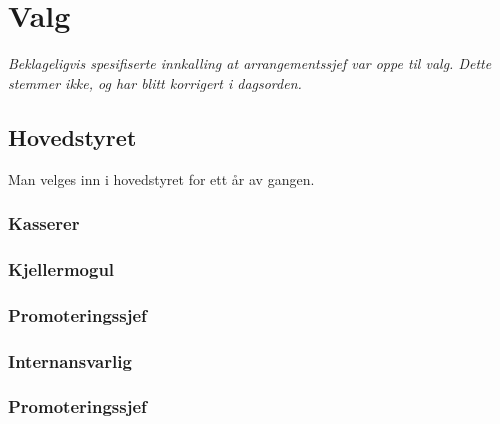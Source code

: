 \documentclass[10pt,norsk,a4paper]{article}
\begin{document}
\newpage

\section{Valg}

\textit{
    Beklageligvis spesifiserte innkalling at arrangementssjef var oppe til valg.
    Dette stemmer ikke, og har blitt korrigert i dagsorden.
}

\begin{minipage}[t]{0.49\textwidth}
\subsection{Hovedstyret} %
Man velges inn i hovedstyret for ett år av gangen.

\subsubsection{Kasserer}
\subsubsection{Kjellermogul}
\subsubsection{Promoteringssjef}
\subsubsection{Internansvarlig}
\subsubsection{Promoteringssjef}

\end{minipage}
\end{document}
